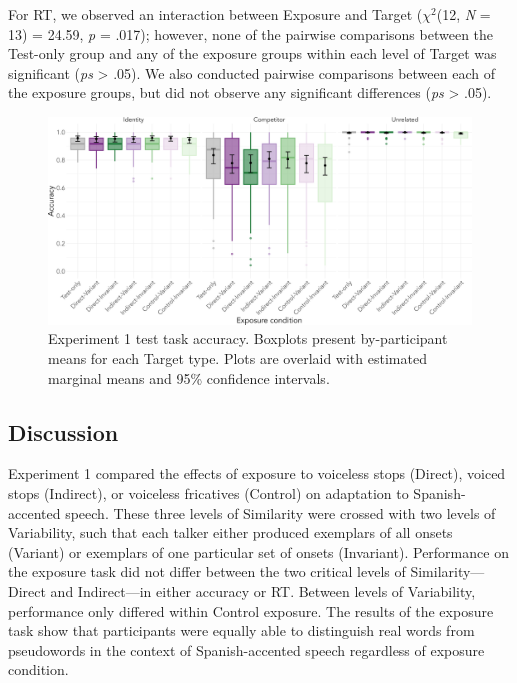 \documentclass[preprint, 3p, authoryear]{elsarticle} %
\begin{document}
For RT, we observed an interaction between Exposure and Target (\(\chi^2\)(12, \emph{N} = 13) = 24.59, \emph{p} = .017); however, none of the pairwise comparisons between the Test-only group and any of the exposure groups within each level of Target was significant (\emph{ps} \textgreater{} .05).
We also conducted pairwise comparisons between each of the exposure groups, but did not observe any significant differences (\emph{ps} \textgreater{} .05).

\begin{figure}

{\centering \includegraphics[width=\textwidth]{sections/code/outputs/plot_test_1a} 

}

\caption{Experiment 1 test task accuracy. Boxplots present by-participant means for each Target type. Plots are overlaid with estimated marginal means and 95\% confidence intervals.}\label{fig:exp1-test-fig}
\end{figure}

\hypertarget{discussion}{%
\subsection{Discussion}\label{discussion}}

Experiment 1 compared the effects of exposure to voiceless stops (Direct), voiced stops (Indirect), or voiceless fricatives (Control) on adaptation to Spanish-accented speech.
These three levels of Similarity were crossed with two levels of Variability, such that each talker either produced exemplars of all onsets (Variant) or exemplars of one particular set of onsets (Invariant).
Performance on the exposure task did not differ between the two critical levels of Similarity---Direct and Indirect---in either accuracy or RT.
Between levels of Variability, performance only differed within Control exposure.
The results of the exposure task show that participants were equally able to distinguish real words from pseudowords in the context of Spanish-accented speech regardless of exposure condition.
\end{document}
